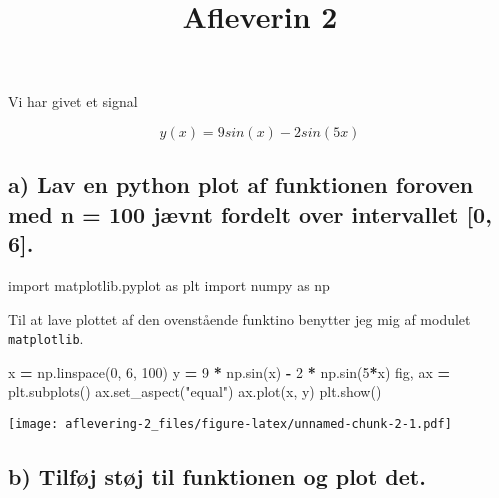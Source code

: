 \documentclass[
]{article}
\title{Afleverin 2}
\author{}
\date{\vspace{-2.5em}}
\newenvironment{Shaded}{\begin{snugshade}}{\end{snugshade}}
\newcommand{\DecValTok}[1]{\textcolor[rgb]{0.00,0.00,0.81}{#1}}
\newcommand{\ImportTok}[1]{#1}
\newcommand{\NormalTok}[1]{#1}
\newcommand{\OperatorTok}[1]{\textcolor[rgb]{0.81,0.36,0.00}{\textbf{#1}}}
\newcommand{\StringTok}[1]{\textcolor[rgb]{0.31,0.60,0.02}{#1}}
\begin{document}
\maketitle

Vi har givet et signal

\[
y(x)= 9 sin(x)-2sin(5x)
\]

\hypertarget{a-lav-en-python-plot-af-funktionen-foroven-med-n-100-juxe6vnt-fordelt-over-intervallet-0-6.}{%
\subsection{a) Lav en python plot af funktionen foroven med n = 100
jævnt fordelt over intervallet {[}0,
6{]}.}\label{a-lav-en-python-plot-af-funktionen-foroven-med-n-100-juxe6vnt-fordelt-over-intervallet-0-6.}}

\begin{Shaded}
\begin{Highlighting}[]
\ImportTok{import}\NormalTok{ matplotlib.pyplot }\ImportTok{as}\NormalTok{ plt}
\ImportTok{import}\NormalTok{ numpy }\ImportTok{as}\NormalTok{ np}
\end{Highlighting}
\end{Shaded}

Til at lave plottet af den ovenstående funktino benytter jeg mig af
modulet \texttt{matplotlib}.

\begin{Shaded}
\begin{Highlighting}[]
\NormalTok{x }\OperatorTok{=}\NormalTok{ np.linspace(}\DecValTok{0}\NormalTok{, }\DecValTok{6}\NormalTok{, }\DecValTok{100}\NormalTok{)}
\NormalTok{y }\OperatorTok{=} \DecValTok{9} \OperatorTok{*}\NormalTok{ np.sin(x) }\OperatorTok{{-}} \DecValTok{2} \OperatorTok{*}\NormalTok{ np.sin(}\DecValTok{5}\OperatorTok{*}\NormalTok{x)}
\NormalTok{fig, ax }\OperatorTok{=}\NormalTok{ plt.subplots()}
\NormalTok{ax.set\_aspect(}\StringTok{"equal"}\NormalTok{)}
\NormalTok{ax.plot(x, y)}
\NormalTok{plt.show()}
\end{Highlighting}
\end{Shaded}

\texttt{[image: aflevering-2\_files/figure-latex/unnamed-chunk-2-1.pdf]}

\hypertarget{b-tilfuxf8j-stuxf8j-til-funktionen-og-plot-det.}{%
\subsection{b) Tilføj støj til funktionen og plot
det.}\label{b-tilfuxf8j-stuxf8j-til-funktionen-og-plot-det.}}
\end{document}
